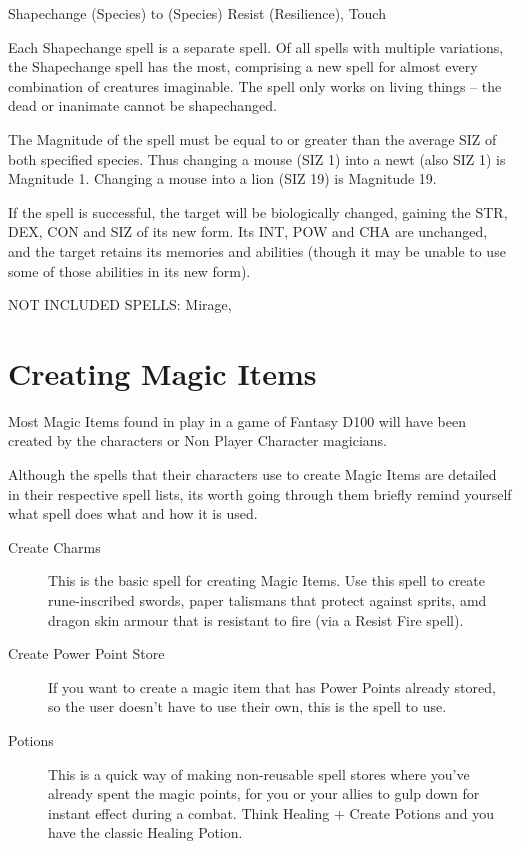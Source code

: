 \begin{samepage}
\begin{rpg-spell}
{Shapechange (Species) to (Species)}
{Resist (Resilience), Touch}

Each Shapechange spell is a separate spell. Of all spells with multiple variations, the Shapechange spell has the most, comprising a new spell for almost every combination of creatures imaginable. The spell only works on living things – the dead or inanimate cannot be shapechanged. 

The Magnitude of the spell must be equal to or greater than the average SIZ of both specified species. Thus changing a mouse (SIZ 1) into a newt (also SIZ 1) is Magnitude 1. Changing a mouse into a lion (SIZ 19) is Magnitude 19. 

If the spell is successful, the target will be biologically changed, gaining the STR, DEX, CON and SIZ of its new form. Its INT, POW and CHA are unchanged, and the target retains its memories and abilities (though it may be unable to use some of those abilities in its new form). 
\end{rpg-spell}
\end{samepage}



\iffalse

NOT INCLUDED SPELLS: Mirage, 

\section{Creating Magic Items}

Most Magic Items found in play in a game of Fantasy D100 will have been created by the characters or Non Player Character magicians.

Although the spells that their characters use to create Magic Items are detailed in their respective spell lists, its worth going through them briefly remind yourself what spell does what and how it is used.

\begin{description}
\item [Create Charms] This is the basic spell for creating Magic Items. Use this spell to create rune-inscribed swords, paper talismans that protect against sprits, amd dragon skin armour that is resistant to fire (via a Resist Fire spell).
\
\item [Create Power Point Store] If you want to create a magic item that has Power Points already stored, so the user doesn’t have to use their own, this is the spell to use.
\item [Potions] This is a quick way of making non-reusable spell stores where you’ve already spent the magic points, for you or your allies to gulp down for instant effect during a combat. Think Healing + Create Potions and you have the classic Healing Potion.
\end{description}

